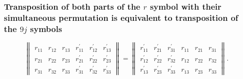 \subsubsection{Transposition of both parts of the $r$ symbol with their simultaneous permutation is equivalent to transposition of the $9 j$ symbols}
\begin{equation}
\left\|\begin{array}{llllll}
r_{11} & r_{12} & r_{13} & r_{11}^{\prime} & r_{12}^{\prime} & r_{13}^{\prime}  \label{eq:10:4:9}\\
r_{21} & r_{22} & r_{23} & r_{21}^{\prime} & r_{22}^{\prime} & r_{23}^{\prime} \\
r_{31} & r_{32} & r_{33} & r_{31}^{\prime} & r_{32}^{\prime} & r_{33}^{\prime}
\end{array}\right\|=\left\|\begin{array}{llllll}
r_{11}^{\prime} & r_{21}^{\prime} & r_{31}^{\prime} & r_{11} & r_{21} & r_{31} \\
r_{12}^{\prime} & r_{22}^{\prime} & r_{32}^{\prime} & r_{12} & r_{22} & r_{32} \\
r_{13}^{\prime} & r_{23}^{\prime} & r_{33}^{\prime} & r_{13} & r_{23} & r_{33}
\end{array}\right\| .
\end{equation}
